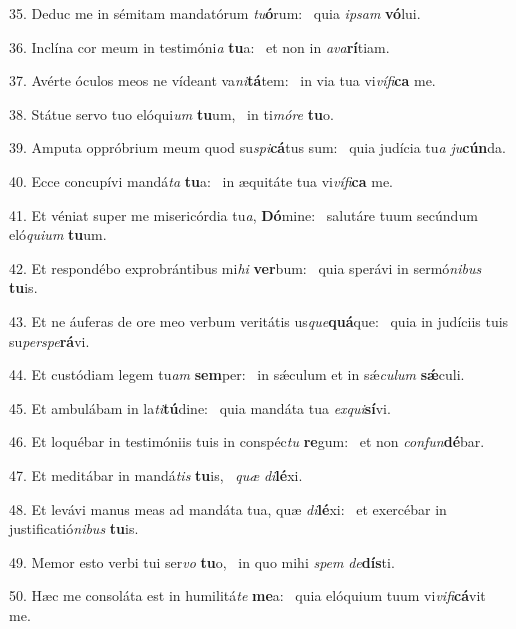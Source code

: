 35. Deduc me in sémitam mandatórum \textit{tu}\textbf{ó}rum: \ast\  quia \textit{ip}\textit{sam} \textbf{vó}lui.\

36. Inclína cor meum in testimóni\textit{a} \textbf{tu}a: \ast\  et non in \textit{a}\textit{va}\textbf{rí}tiam.\

37. Avérte óculos meos ne vídeant va\textit{ni}\textbf{tá}tem: \ast\  in via tua vi\textit{ví}\textit{fi}\textbf{ca} me.\

38. Státue servo tuo elóqui\textit{um} \textbf{tu}um, \ast\  in ti\textit{mó}\textit{re} \textbf{tu}o.\

39. Amputa oppróbrium meum quod su\textit{spi}\textbf{cá}tus sum: \ast\  quia judícia tu\textit{a} \textit{ju}\textbf{cún}da.\

40. Ecce concupívi mandá\textit{ta} \textbf{tu}a: \ast\  in æquitáte tua vi\textit{ví}\textit{fi}\textbf{ca} me.\

41. Et véniat super me misericórdia tu\textit{a}, \textbf{Dó}mine: \ast\  salutáre tuum secúndum eló\textit{qui}\textit{um} \textbf{tu}um.\

42. Et respondébo exprobrántibus mi\textit{hi} \textbf{ver}bum: \ast\  quia sperávi in sermó\textit{ni}\textit{bus} \textbf{tu}is.\

43. Et ne áuferas de ore meo verbum veritátis us\textit{que}\textbf{quá}que: \ast\  quia in judíciis tuis su\textit{per}\textit{spe}\textbf{rá}vi.\

44. Et custódiam legem tu\textit{am} \textbf{sem}per: \ast\  in sǽculum et in sǽ\textit{cu}\textit{lum} \textbf{sǽ}culi.\

45. Et ambulábam in la\textit{ti}\textbf{tú}dine: \ast\  quia mandáta tua \textit{ex}\textit{qui}\textbf{sí}vi.\

46. Et loquébar in testimóniis tuis in conspéc\textit{tu} \textbf{re}gum: \ast\  et non \textit{con}\textit{fun}\textbf{dé}bar.\

47. Et meditábar in mandá\textit{tis} \textbf{tu}is, \ast\  \textit{quæ} \textit{di}\textbf{lé}xi.\

48. Et levávi manus meas ad mandáta tua, quæ \textit{di}\textbf{lé}xi: \ast\  et exercébar in justificatió\textit{ni}\textit{bus} \textbf{tu}is.\

49. Memor esto verbi tui ser\textit{vo} \textbf{tu}o, \ast\  in quo mihi \textit{spem} \textit{de}\textbf{dís}ti.\

50. Hæc me consoláta est in humilitá\textit{te} \textbf{me}a: \ast\  quia elóquium tuum vi\textit{vi}\textit{fi}\textbf{cá}vit me.\

